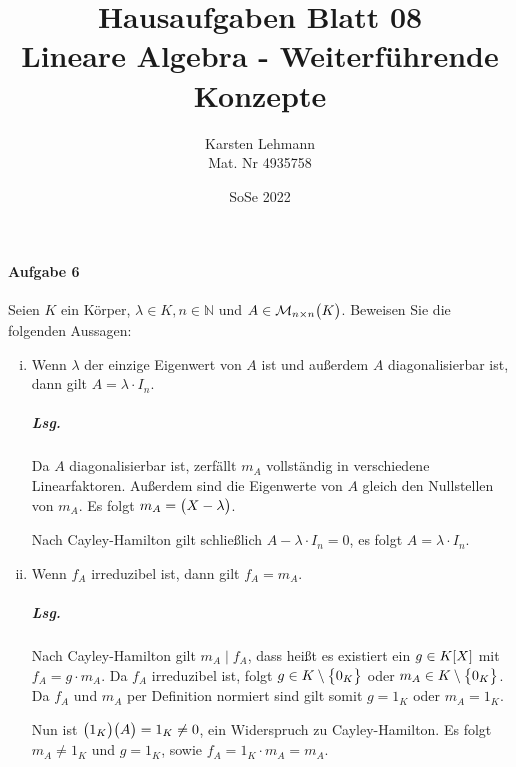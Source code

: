 \documentclass{scrreprt}
\author{Karsten Lehmann\\Mat. Nr 4935758}
\date{SoSe 2022}
\title{Hausaufgaben Blatt 08\\Lineare Algebra - Weiterführende Konzepte}
\begin{document}
\paragraph{Aufgabe 6} Seien $K$ ein Körper, $\lambda \in K, n \in \mathbb{N}$ und
$A \in \mathcal{M}_{n \times n}\qty\big(K)$.
Beweisen Sie die folgenden Aussagen:
\begin{enumerate}[(i)]
\item Wenn $\lambda$ der einzige Eigenwert von $A$ ist und außerdem $A$
  diagonalisierbar ist, dann gilt $A = \lambda \cdot I_n$.

  \subparagraph{Lsg.} Da $A$ diagonalisierbar ist, zerfällt $m_A$ vollständig in
  verschiedene Linearfaktoren.
  Außerdem sind die Eigenwerte von $A$ gleich den Nullstellen von $m_A$.
  Es folgt $m_A = \qty\big(X - \lambda)$.

  Nach Cayley-Hamilton gilt schließlich $A - \lambda \cdot I_n = 0$, es folgt
  $A = \lambda \cdot I_n$.

\item Wenn $f_A$ irreduzibel ist, dann gilt $f_A = m_A$.

  \subparagraph{Lsg.} Nach Cayley-Hamilton gilt $m_A \mid f_A$,
  dass heißt es existiert ein $g \in K\qty[X]$ mit
  $f_A = g \cdot m_A$.
  Da $f_A$ irreduzibel ist, folgt $g \in K \setminus \qty\big{0_K}$ oder
  $m_A \in K \setminus \qty\big{0_K}$.
  Da $f_A$ und $m_A$ per Definition normiert sind gilt somit $g = 1_K$ oder
  $m_A = 1_K$.

  Nun ist $\qty\big(1_K)\qty\big(A) = 1_K \ne 0$, ein Widerspruch zu
  Cayley-Hamilton.
  Es folgt $m_A \ne 1_K$ und $g = 1_K$, sowie $f_A = 1_K \cdot m_A = m_A$.
\end{enumerate}
\end{document}
